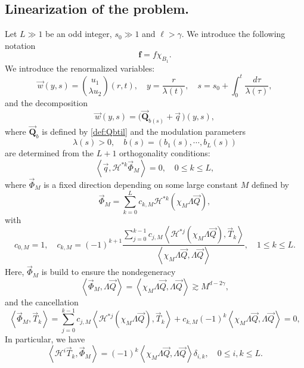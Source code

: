 \documentclass[11pt]{aims}
\theoremstyle{definition}
\numberwithin{equation}{section}
\begin{document}
\subsection{Linearization of the problem.} 
Let $L \gg 1$ be an odd integer, $s_0 \gg 1$ and $\ell > \gamma$. 
We introduce the following notation $$\mathbf{f}= f\chi_{B_1}.$$
We introduce the renormalized variables:
\begin{equation}
\vec w(y,s) = \binom{u_1}{\lambda u_2}(r,t), \quad y = \frac{r}{\lambda(t)}, \quad s = s_0 + \int_0^t \frac{d\tau}{\lambda(\tau)},
\end{equation} 
and the decomposition
\begin{equation}\label{def:qys}
\vec w(y,s) = \big(\vec{\mathbf{Q}}_{b(s)} + \vec q \,\big)(y,s),
\end{equation}
where $\vec{\mathbf{Q}}_b$ is defined by \eqref{def:Qbtil} and the modulation parameters 
$$\lambda(s) > 0, \quad b(s) = (b_1(s), \cdots, b_L(s))$$
are determined from the $L+1$ orthogonality conditions:
\begin{equation}\label{eq:orthqPhiM}
\left<\vec q, {\mathscr{H}}^{*k} \vec \Phi_M \right> = 0, \quad 0 \leq k \leq L,
\end{equation} 
where $\vec \Phi_M$ is a fixed direction depending on some large constant $M$ defined by
\begin{equation}\label{def:PhiM}
\vec \Phi_M = \sum_{k = 0}^L c_{k,M}{\mathscr{H}}^{*k}(\chi_M \Lambda \vec Q),
\end{equation}
with 
\begin{equation}\label{def:ckM}
c_{0,M} = 1, \quad c_{k, M} = (-1)^{k+1}\frac{\sum_{j = 0}^{k - 1}c_{j,M}\left<{\mathscr{H}}^{*j}(\chi_M \Lambda \vec Q), \vec T_k\right> }{\left<\chi_M \Lambda \vec Q, \Lambda \vec Q\right>}, \quad 1 \leq k \leq L.
\end{equation}
Here, $\vec \Phi_M$ is build to ensure the nondegeneracy 
\begin{equation}\label{eq:PhiMLamQ}
\left<\vec \Phi_M, \Lambda \vec Q\right> = \left<\chi_M \Lambda \vec Q, \Lambda \vec Q\right> \gtrsim M^{d - 2\gamma},
\end{equation}
and the cancellation 
\begin{equation}\label{id:TkPhiM0}
\left<\vec \Phi_M, \vec T_k\right> = \sum_{j = 0}^{k - 1}c_{j,M}\left<{\mathscr{H}}^{*j}(\chi_M\Lambda \vec Q), \vec T_k\right> + c_{k,M} (-1)^k \left<\chi_M \Lambda \vec Q, \Lambda \vec Q\right> = 0,
\end{equation}
In particular, we have 
\begin{equation}\label{id:TkPhiMi}
\left<{\mathscr{H}}^i\vec T_k, \vec\Phi_M \right> = (-1)^k\left<\chi_M \Lambda \vec Q, \Lambda \vec Q\right>\delta_{i,k}, \quad 0 \leq i,k\leq L.
\end{equation}
\end{document}
